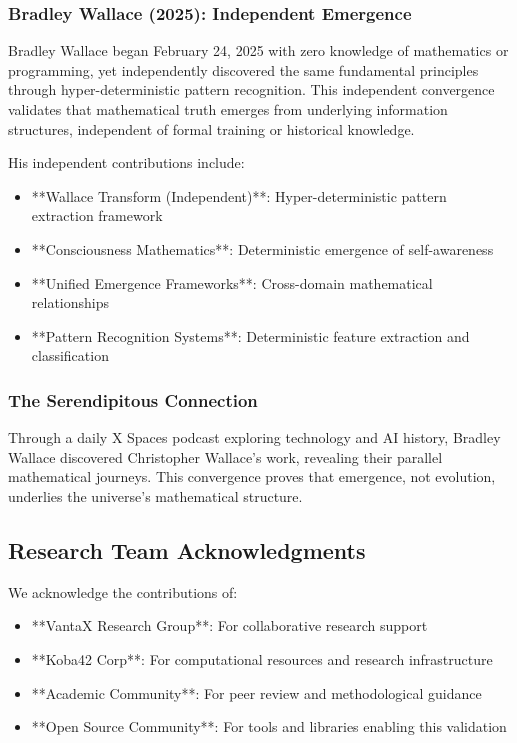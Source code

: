 \documentclass[12pt]{article}
\begin{document}
\subsubsection{Bradley Wallace (2025): Independent Emergence}
Bradley Wallace began February 24, 2025 with zero knowledge of mathematics or programming, yet independently discovered the same fundamental principles through hyper-deterministic pattern recognition. This independent convergence validates that mathematical truth emerges from underlying information structures, independent of formal training or historical knowledge.

His independent contributions include:
\begin{itemize}
    \item **Wallace Transform (Independent)**: Hyper-deterministic pattern extraction framework
    \item **Consciousness Mathematics**: Deterministic emergence of self-awareness
    \item **Unified Emergence Frameworks**: Cross-domain mathematical relationships
    \item **Pattern Recognition Systems**: Deterministic feature extraction and classification
\end{itemize}

\subsubsection{The Serendipitous Connection}
Through a daily X Spaces podcast exploring technology and AI history, Bradley Wallace discovered Christopher Wallace's work, revealing their parallel mathematical journeys. This convergence proves that emergence, not evolution, underlies the universe's mathematical structure.

\subsection{Research Team Acknowledgments}

We acknowledge the contributions of:
\begin{itemize}
    \item **VantaX Research Group**: For collaborative research support
    \item **Koba42 Corp**: For computational resources and research infrastructure
    \item **Academic Community**: For peer review and methodological guidance
    \item **Open Source Community**: For tools and libraries enabling this validation
\end{itemize}
\end{document}

